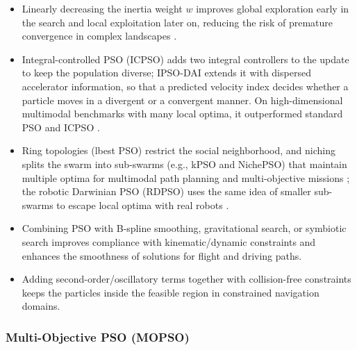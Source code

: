 \begin{itemize}
  \item {} Linearly decreasing the inertia weight $w$
        improves global exploration early in the search and local exploitation
        later on, reducing the risk of premature convergence in complex
        landscapes \cite{chen2019path}.
  \item {} Integral-controlled PSO
        (ICPSO) adds two integral controllers to the update to keep the
        population diverse; IPSO-DAI extends it with dispersed accelerator
        information, so that a predicted velocity index decides whether a particle
        moves in a divergent or a convergent manner. On high-dimensional
        multimodal benchmarks with many local optima, it outperformed standard
        PSO and ICPSO \cite{panigrahi2011handbook}.
  \item {} Ring topologies (lbest PSO) restrict the social
        neighborhood, and niching splits the swarm into sub-swarms (e.g., kPSO
        and NichePSO) that maintain multiple optima for multimodal path planning
        and multi-objective missions \cite{panigrahi2011handbook}; the robotic
        Darwinian PSO (RDPSO) uses the same idea of smaller sub-swarms to escape
        local optima with real robots \cite{dias2021swarm}.
  \item {} Combining PSO with B-spline smoothing, gravitational search,
        or symbiotic search improves compliance with kinematic/dynamic
        constraints and enhances the smoothness of solutions for flight and
        driving paths.
  \item {} Adding second-order/oscillatory
        terms together with collision-free constraints keeps the particles inside
        the feasible region in constrained navigation domains.
\end{itemize}

\subsubsection{Multi-Objective PSO (MOPSO)}

